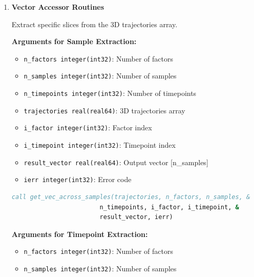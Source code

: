 \documentclass[11pt]{article}
\begin{document}
\begin{enumerate}
\begin{enumerate}
	      	\item \textbf{Vector Accessor Routines}
	      	      
	      	      Extract specific slices from the 3D trajectories array.
	      	      
	      	      \textbf{Arguments for Sample Extraction:}
	      	      \begin{itemize}
	      	      	\item \texttt{n\_factors integer(int32)}: Number of factors
	      	      	      
	      	      	\item \texttt{n\_samples integer(int32)}: Number of samples
	      	      	      
	      	      	\item \texttt{n\_timepoints integer(int32)}: Number of timepoints
	      	      	      
	      	      	\item \texttt{trajectories real(real64)}: 3D trajectories array
	      	      	      
	      	      	\item \texttt{i\_factor integer(int32)}: Factor index
	      	      	      
	      	      	\item \texttt{i\_timepoint integer(int32)}: Timepoint index
	      	      	      
	      	      	\item \texttt{result\_vector real(real64)}: Output vector [n\_samples]
	      	      	      
	      	      	\item \texttt{ierr integer(int32)}: Error code
	      	      \end{itemize}
	      	      \begin{lstlisting}[language=Fortran, caption={Extract Samples Vector}]
call get_vec_across_samples(trajectories, n_factors, n_samples, &
                        n_timepoints, i_factor, i_timepoint, &
                        result_vector, ierr)
	      	      \end{lstlisting}
	      	      
	      	      \textbf{Arguments for Timepoint Extraction:}
	      	      \begin{itemize}
	      	      	\item \texttt{n\_factors integer(int32)}: Number of factors
	      	      	      
	      	      	\item \texttt{n\_samples integer(int32)}: Number of samples
	      	      	      

\end{itemize}
\end{enumerate}
\end{enumerate}
\end{document}

